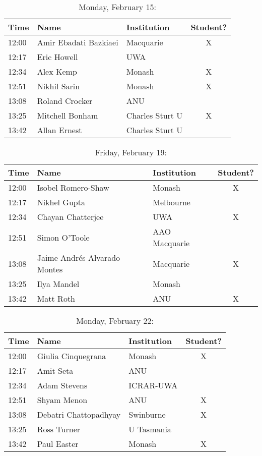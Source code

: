 \documentclass[amsmath,onecolumn]{revtex4-1}
\begin{document}
\begin{table}[!htbp]
	\centering
	\caption{Monday, February 15:}
\begin{tabular}{| l | l | l | c |}
	\hline
	Time & Name  & Institution & Student? \\ 		
	\hline
	12:00 & Amir	Ebadati Bazkiaei & Macquarie & X \\
	12:17 &  Eric	Howell & UWA &\\
	12:34 & Alex	Kemp &  Monash & X\\
	12:51 & Nikhil	Sarin & Monash & X   \\
	13:08 & Roland	Crocker & ANU & \\
	13:25 & Mitchell	Bonham & Charles Sturt U  & X\\
	13:42 & Allan Ernest & Charles Sturt U & \\
	\hline
\end{tabular}
\end{table}

\begin{table}[!htbp]
	\centering
	\caption{Friday, February 19:}
\begin{tabular}{| l | l | l | c |}
	\hline
	Time & Name  & Institution & Student? \\ 		
	\hline
	12:00 &  Isobel	Romero-Shaw & Monash & X\\
	12:17 & Nikhel	Gupta  & Melbourne & \\
	12:34 & Chayan	Chatterjee & UWA  & X \\
	12:51 & Simon	O'Toole &	AAO Macquarie  & \\
	13:08 & Jaime Andr\'{e}s	Alvarado Montes &  Macquarie & X\\
	13:25 & Ilya Mandel & Monash & \\
	13:42 & Matt	Roth & ANU & X\\
	\hline
\end{tabular}
\end{table}

\begin{table}[!htbp]
	\centering
	\caption{Monday, February 22:}
\begin{tabular}{| l | l | l | c |}
	\hline
	Time & Name  & Institution & Student? \\ 		
	\hline
	12:00 & Giulia	Cinquegrana & Monash & X\\
	12:17 & Amit 	Seta & ANU  & \\
	12:34 & Adam	Stevens & ICRAR-UWA &\\
	12:51 & Shyam	Menon & ANU & X\\
	13:08 & Debatri 	Chattopadhyay & Swinburne  & X \\
	13:25 & Ross	Turner  & U Tasmania  & \\
	13:42 & Paul	Easter & Monash & X\\
	\hline
\end{tabular}
\end{table}
\end{document}
